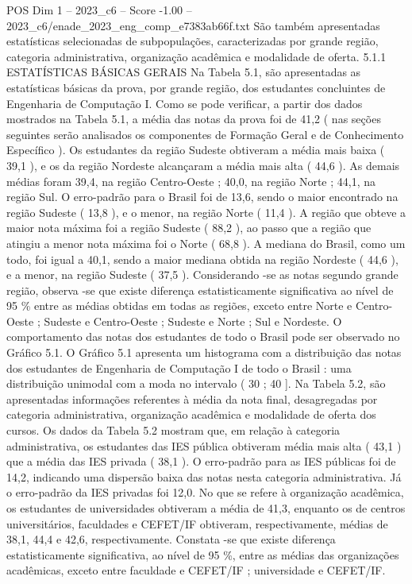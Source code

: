 \begin{textsample}{POS Dim 1 – 2023\_c6 – Score -1.00 – 2023\_c6/enade\_2023\_eng\_comp\_e7383ab66f.txt}
São também apresentadas estatísticas selecionadas de subpopulações, caracterizadas por grande região, categoria administrativa, organização acadêmica e modalidade de oferta. 5.1.1 ESTATÍSTICAS BÁSICAS GERAIS Na Tabela 5.1, são apresentadas as estatísticas básicas da prova, por grande região, dos estudantes concluintes de Engenharia de Computação I.
Como se pode verificar, a partir dos dados mostrados na Tabela 5.1, a média das notas da prova foi de 41,2 ( nas seções seguintes serão analisados os componentes de Formação Geral e de Conhecimento Específico ).
Os estudantes da região Sudeste obtiveram a média mais baixa ( 39,1 ), e os da região Nordeste alcançaram a média mais alta ( 44,6 ).
As demais médias foram 39,4, na região Centro-Oeste ; 40,0, na região Norte ; 44,1, na região Sul.
O erro-padrão para o Brasil foi de 13,6, sendo o maior encontrado na região Sudeste ( 13,8 ), e o menor, na região Norte ( 11,4 ).
A região que obteve a maior nota máxima foi a região Sudeste ( 88,2 ), ao passo que a região que atingiu a menor nota máxima foi o Norte ( 68,8 ).
A mediana do Brasil, como um todo, foi igual a 40,1, sendo a maior mediana obtida na região Nordeste ( 44,6 ), e a menor, na região Sudeste ( 37,5 ).
Considerando -se as notas segundo grande região, observa -se que existe diferença estatisticamente significativa ao nível de 95 \% entre as médias obtidas em todas as regiões, exceto entre Norte e Centro-Oeste ; Sudeste e Centro-Oeste ; Sudeste e Norte ; Sul e Nordeste.
O comportamento das notas dos estudantes de todo o Brasil pode ser observado no Gráfico 5.1.
O Gráfico 5.1 apresenta um histograma com a distribuição das notas dos estudantes de Engenharia de Computação I de todo o Brasil : uma distribuição unimodal com a moda no intervalo ( 30 ; 40 ].
Na Tabela 5.2, são apresentadas informações referentes à média da nota final, desagregadas por categoria administrativa, organização acadêmica e modalidade de oferta dos cursos.
Os dados da Tabela 5.2 mostram que, em relação à categoria administrativa, os estudantes das IES pública obtiveram média mais alta ( 43,1 ) que a média das IES privada ( 38,1 ).
O erro-padrão para as IES públicas foi de 14,2, indicando uma dispersão baixa das notas nesta categoria administrativa.
Já o erro-padrão da IES privadas foi 12,0.
No que se refere à organização acadêmica, os estudantes de universidades obtiveram a média de 41,3, enquanto os de centros universitários, faculdades e CEFET/IF obtiveram, respectivamente, médias de 38,1, 44,4 e 42,6, respectivamente.
Constata -se que existe diferença estatisticamente significativa, ao nível de 95 \%, entre as médias das organizações acadêmicas, exceto entre faculdade e CEFET/IF ; universidade e CEFET/IF.

\end{textsample}

